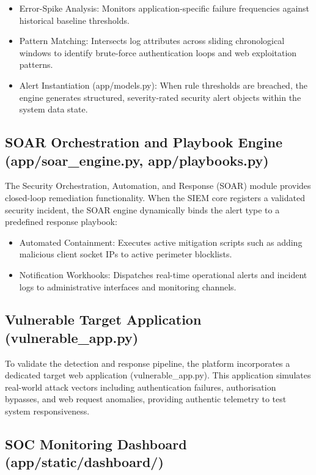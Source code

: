 \begin{itemize}
  \item Error-Spike Analysis: Monitors application-specific failure frequencies against historical baseline thresholds.
  \item Pattern Matching: Intersects log attributes across sliding chronological windows to identify brute-force authentication loops and web exploitation patterns.
  \item Alert Instantiation (app/models.py): When rule thresholds are breached, the engine generates structured, severity-rated security alert objects within the system data state.
\end{itemize}

\subsection{SOAR Orchestration and Playbook Engine (app/soar\_engine.py, app/playbooks.py)}

The Security Orchestration, Automation, and Response (SOAR) module provides closed-loop remediation functionality. When the SIEM core registers a validated security incident, the SOAR engine dynamically binds the alert type to a predefined response playbook:

\begin{itemize}
  \item Automated Containment: Executes active mitigation scripts such as adding malicious client socket IPs to active perimeter blocklists.
  \item Notification Workhooks: Dispatches real-time operational alerts and incident logs to administrative interfaces and monitoring channels.
\end{itemize}

\subsection{Vulnerable Target Application (vulnerable\_app.py)}

To validate the detection and response pipeline, the platform incorporates a dedicated target web application (vulnerable\_app.py). This application simulates real-world attack vectors including authentication failures, authorisation bypasses, and web request anomalies, providing authentic telemetry to test system responsiveness.

\subsection{SOC Monitoring Dashboard (app/static/dashboard/)}

